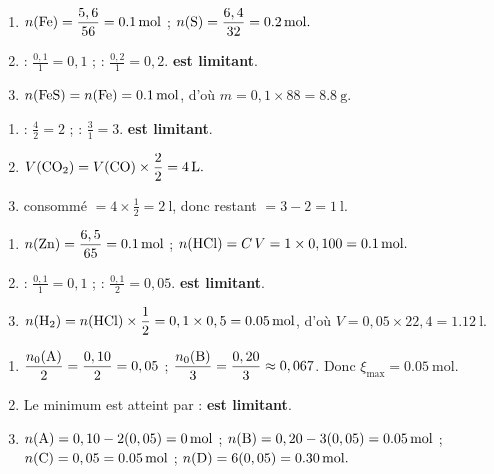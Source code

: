 \documentclass[11pt,a4paper]{article}
\begin{document}
\begin{corrige}
\begin{enumerate}[label=\alph*)]
  \item $n(\ce{Fe})=\dfrac{5,6}{56}=\qty{0.1}{\mole}$ ; $n(\ce{S})=\dfrac{6,4}{32}=\qty{0.2}{\mole}.$
  \item {} : $\frac{0,1}{1}=0,1$ ;  : $\frac{0,2}{1}=0,2$. \textbf{ est limitant}.
  \item $n(\ce{FeS})=n(\ce{Fe})=\qty{0.1}{\mole}$, d'où $m=0,1\times88=\qty{8.8}{\gram}.$
\end{enumerate}
\end{corrige}

\begin{corrige}
\begin{enumerate}[label=\alph*)]
  \item {} : $\frac{4}{2}=2$ ;  : $\frac{3}{1}=3$. \textbf{ est limitant}.
  \item $V(\ce{CO2})=V(\ce{CO})\times\dfrac{2}{2}=\qty{4}{\litre}.$
  \item {} consommé $=4\times\frac{1}{2}=\qty{2}{\litre}$, donc restant $=3-2=\qty{1}{\litre}.$
\end{enumerate}
\end{corrige}

\begin{corrige}
\begin{enumerate}[label=\alph*)]
  \item $n(\ce{Zn})=\dfrac{6,5}{65}=\qty{0.1}{\mole}$ ; $n(\ce{HCl})=C\,V=1\times0,100=\qty{0.1}{\mole}.$
  \item {} : $\frac{0,1}{1}=0,1$ ;  : $\frac{0,1}{2}=0,05$. \textbf{ est limitant}.
  \item $n(\ce{H2})=n(\ce{HCl})\times\dfrac{1}{2}=0,1\times0,5=\qty{0.05}{\mole}$, d'où
        $V=0,05\times22,4=\qty{1.12}{\litre}.$
\end{enumerate}
\end{corrige}

\begin{corrige}
\begin{enumerate}[label=\alph*)]
  \item $\dfrac{n_0(\ce{A})}{2}=\dfrac{0,10}{2}=0,05$ ; $\dfrac{n_0(\ce{B})}{3}=\dfrac{0,20}{3}\approx0,067$.
        Donc $\xi_{\max}=\qty{0.05}{\mole}.$
  \item Le minimum est atteint par  : \textbf{ est limitant}.
  \item $n(\ce{A})=0,10-2(0,05)=\qty{0}{\mole}$ ; $n(\ce{B})=0,20-3(0,05)=\qty{0.05}{\mole}$ ;
        $n(\ce{C})=0,05=\qty{0.05}{\mole}$ ; $n(\ce{D})=6(0,05)=\qty{0.30}{\mole}.$
\end{enumerate}
\end{corrige}
\end{document}
